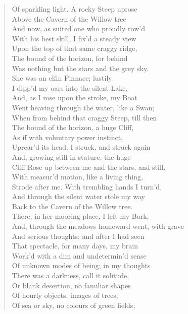 \begin{verse}
Of sparkling light. A rocky Steep uprose  \\
Above the Cavern of the Willow tree  \\
And now, as suited one who proudly row'd  \\
With his best skill, I fix'd a steady view	  \\
Upon the top of that same craggy ridge,  \\
The bound of the horizon, for behind  \\
Was nothing but the stars and the grey sky.  \\
She was an elfin Pinnace; lustily  \\
I dipp'd my oars into the silent Lake,	  \\
And, as I rose upon the stroke, my Boat  \\
Went heaving through the water, like a Swan;  \\
When from behind that craggy Steep, till then  \\
The bound of the horizon, a huge Cliff,  \\
As if with voluntary power instinct,	  \\
Uprear'd its head. I struck, and struck again  \\
And, growing still in stature, the huge  \\
Cliff Rose up between me and the stars, and still,  \\
With measur'd motion, like a living thing,  \\
Strode after me. With trembling hands I turn'd,	  \\
And through the silent water stole my way  \\
Back to the Cavern of the Willow tree.  \\
There, in her mooring-place, I left my Bark,  \\
And, through the meadows homeward went, with grave  \\
And serious thoughts; and after I had seen	  \\
That spectacle, for many days, my brain  \\
Work'd with a dim and undetermin'd sense  \\
Of unknown modes of being; in my thoughts  \\
There was a darkness, call it solitude,  \\
Or blank desertion, no familiar shapes	  \\
Of hourly objects, images of trees,  \\
Of sea or sky, no colours of green fields;  \\

\end{verse}
